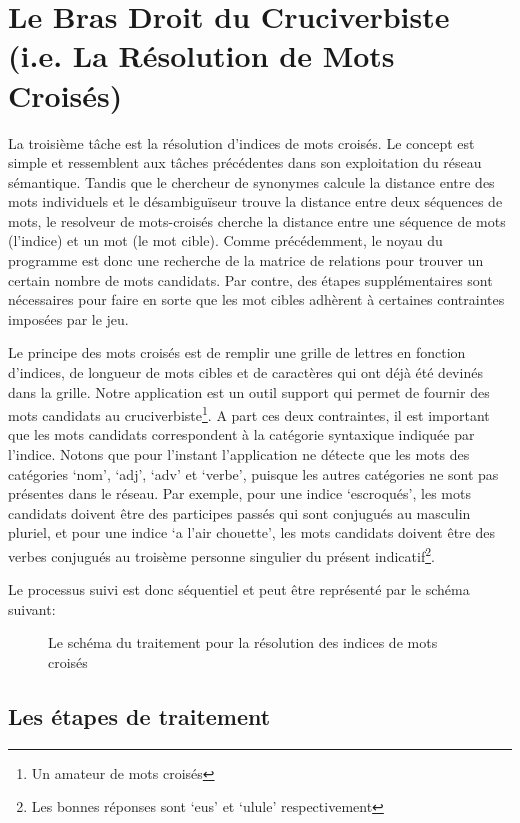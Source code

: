 \section{Le Bras Droit du Cruciverbiste (i.e. La Résolution de Mots Croisés)}

La troisième tâche est la résolution d'indices de mots croisés. Le concept est 
simple et ressemblent aux tâches précédentes dans son exploitation du réseau 
sémantique. Tandis que le chercheur de synonymes calcule la distance entre des 
mots individuels et le désambiguïseur trouve la distance entre deux séquences de 
mots, le resolveur de mots-croisés cherche la distance entre une séquence de 
mots (l'indice) et un mot (le mot cible). Comme précédemment, le noyau du 
programme est donc une recherche de la matrice de relations pour trouver un 
certain nombre de mots candidats. Par contre, des étapes supplémentaires sont 
nécessaires pour faire en sorte que les mot cibles adhèrent à certaines 
contraintes imposées par le jeu.

Le principe des mots croisés est de remplir une grille de lettres en fonction 
d'indices, de longueur de mots cibles et de caractères qui ont déjà été devinés 
dans la grille. Notre application est un outil support qui permet de fournir des 
mots candidats au cruciverbiste\footnote{Un amateur de mots croisés}. A part ces 
deux contraintes, il est important que les mots candidats correspondent à la 
catégorie syntaxique indiquée par l'indice. Notons que pour l'instant 
l'application ne détecte que les mots des catégories \lq{nom}\rq, \lq{adj}\rq, 
\lq{adv}\rq{} et \lq{verbe}\rq, puisque les autres catégories ne sont pas 
présentes dans le réseau. Par exemple, pour une indice \lq{escroqués}\rq, les 
mots candidats doivent être des participes passés qui sont conjugués au masculin 
pluriel, et pour une indice \lq{a l'air chouette}\rq, les mots candidats doivent 
être des verbes conjugués au troisème personne singulier du présent 
indicatif\footnote{Les bonnes réponses sont \lq{eus}\rq{}  et \lq{ulule}\rq{} 
respectivement}.

Le processus suivi est donc séquentiel et peut être représenté par le schéma 
suivant:

\begin{figure}[!ht]
\centering
\def\svgwidth{\columnwidth}

\caption{Le schéma du traitement pour la résolution des indices de mots croisés}
\label{fig:schema_crosswords}
\end{figure}

\subsection{Les étapes de traitement}
